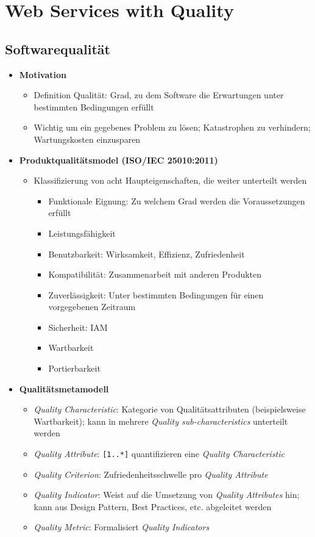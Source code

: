 \section{Web Services with Quality}

\subsection{Softwarequalität}
\begin{itemize}
	\item \textbf{Motivation}
	\begin{itemize}
		\item Definition Qualität: Grad, zu dem Software die Erwartungen unter bestimmten Bedingungen erfüllt
		\item Wichtig um ein gegebenes Problem zu lösen; Katastrophen zu verhindern; Wartungskosten einzusparen
	\end{itemize}
	\item \textbf{Produktqualitätsmodel (ISO/IEC 25010:2011)}
	\begin{itemize}
		\item Klassifizierung von acht Haupteigenschaften, die weiter unterteilt werden
		\begin{itemize}
			\item Funktionale Eignung: Zu welchem Grad werden die Voraussetzungen erfüllt
			\item Leistungsfähigkeit
			\item Benutzbarkeit: Wirksamkeit, Effizienz, Zufriedenheit
			\item Kompatibilität: Zusammenarbeit mit anderen Produkten
			\item Zuverlässigkeit: Unter bestimmten Bedingungen für einen vorgegebenen Zeitraum
			\item Sicherheit: IAM
			\item Wartbarkeit
			\item Portierbarkeit
		\end{itemize}
	\end{itemize}
	\item \textbf{Qualitätsmetamodell}
	\begin{itemize}
		\item \textit{Quality Characteristic}: Kategorie von Qualitätsattributen (beispielsweise Wartbarkeit); kann in mehrere \textit{Quality sub-characteristics} unterteilt werden
		\item \textit{Quality Attribute}: \texttt{[1..*]} quantifizieren eine \textit{Quality Characteristic}
		\item \textit{Quality Criterion}: Zufriedenheitsschwelle pro \textit{Quality Attribute}
		\item \textit{Quality Indicator}: Weist auf die Umsetzung von \textit{Quality Attributes} hin; kann aus Design Pattern, Best Practices, etc. abgeleitet werden
		\item \textit{Quality Metric}: Formalisiert \textit{Quality Indicators}
	\end{itemize}
\end{itemize}


